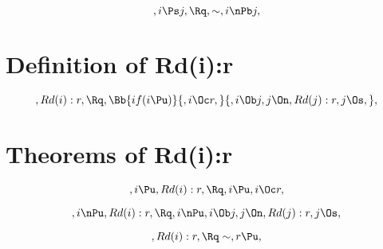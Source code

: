 \[ , i \Ps j, \Rq ,\sim, i \nPb j,\]



\bigskip
\bigskip
\section{Definition of Rd(i):r}

\[, Rd(i):r, \Rq ,\Bb{if(i \Pu )}{, i \Oc r,}{, i \Ob j, j \On, Rd(j):r, j \Os,},\]


\bigskip
\bigskip
\section{Theorems of Rd(i):r}
\[, i \Pu, Rd(i):r, \Rq , i \Pu, i \Oc r, \]

\[, i \nPu, Rd(i):r, \Rq , i \nPu, i \Ob j, j \On, Rd(j):r, j \Os, \]


\[, Rd(i):r, \Rq \sim, r \Pu,\]


